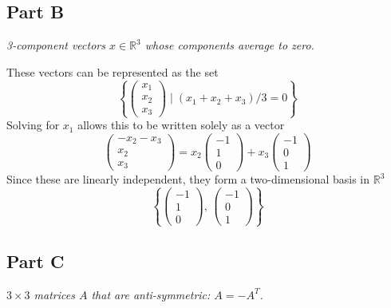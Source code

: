 \documentclass{article}
\begin{document}
\subsection*{Part B}

\textit{3-component vectors $x \in \mathbb{R}^3$ whose components average to
zero.}

\bigbreak

These vectors can be represented as the set
$$ \left\{ \begin{pmatrix}
    x_1 \\
    x_2 \\
    x_3
\end{pmatrix} \mid (x_1 + x_2 + x_3) / 3 = 0 \right\} $$
Solving for $ x_1 $ allows this to be written solely as a vector
$$ \begin{pmatrix}
    -x_2 - x_3 \\
    x_2 \\
    x_3
\end{pmatrix} = x_2 \begin{pmatrix}
    -1 \\
    1 \\
    0
\end{pmatrix} + x_3 \begin{pmatrix}
    -1 \\
    0 \\
    1
\end{pmatrix} $$
Since these are linearly independent, they form a two-dimensional basis in $
\mathbb{R}^3 $
$$ \left\{ \begin{pmatrix}
    -1 \\
    1 \\
    0
\end{pmatrix},\, \begin{pmatrix}
    -1 \\
    0 \\
    1
\end{pmatrix} \right\} $$

\subsection*{Part C}

\textit{$3\times 3$ matrices $A$ that are anti-symmetric: $A = -A^T$.}

\bigbreak
\end{document}
